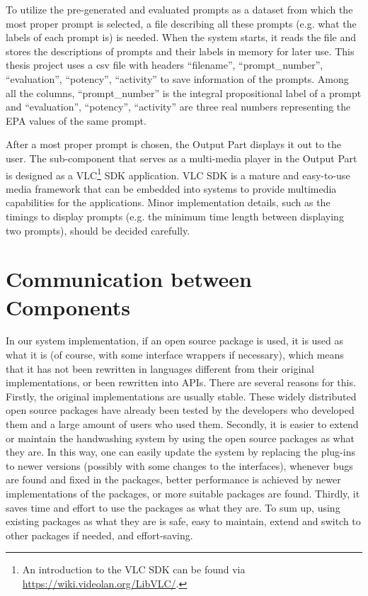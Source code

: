 To utilize the pre-generated and evaluated prompts as a dataset from which the most proper prompt is selected, a file describing all these prompts (e.g. what the labels of each prompt is) is needed. When the system starts, it reads the file and stores the descriptions of prompts and their labels in memory for later use. This thesis project uses a csv file with headers ``filename'', ``prompt\_number'', ``evaluation'', ``potency'', ``activity'' to save information of the prompts. Among all the columns, ``prompt\_number'' is the integral propositional label of a prompt and ``evaluation'', ``potency'', ``activity'' are three real numbers representing the EPA values of the same prompt. 

After a most proper prompt is chosen, the Output Part displays it out to the user. The sub-component that serves as a multi-media player in the Output Part is designed as a VLC\footnote{An introduction to the VLC SDK can be found via \url{https://wiki.videolan.org/LibVLC/}.} SDK application. VLC SDK is a mature and easy-to-use media framework that can be embedded into systems to provide multimedia capabilities for the applications. Minor implementation details, such as the timings to display prompts (e.g. the minimum time length between displaying two prompts), should be decided carefully.

\section{Communication between Components}


In our system implementation, if an open source package is used, it is used as what it is (of course, with some interface wrappers if necessary), which means that it has not been rewritten in languages different from their original implementations, or been rewritten into APIs. There are several reasons for this. Firstly, the original implementations are usually stable. These widely distributed open source packages have already been tested by the developers who developed them and a large amount of users who used them. Secondly, it is easier to extend or maintain the handwashing system by using the open source packages as what they are. In this way, one can easily update the system by replacing the plug-ins to newer versions (possibly with some changes to the interfaces), whenever bugs are found and fixed in the packages, better performance is achieved by newer implementations of the packages, or more suitable packages are found. Thirdly, it saves time and effort to use the packages as what they are. To sum up, using existing packages as what they are is safe, easy to maintain, extend and switch to other packages if needed, and effort-saving.

